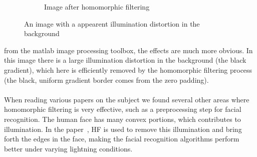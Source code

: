 \begin{figure}[h!]
\begin{subfigure}[b]{0.5\linewidth}
          \caption{Image after homomorphic filtering}
          \label{fig:microbe_after}
        \end{subfigure}
        \caption{An image with a appearent illumination distortion in the background}	
        \label{fig:gamma_diff}
		\end{figure}
		from the matlab image processing toolbox, the effects are much more obvious. 
		In this image there is a large illumination
		distortion in the background (the black gradient), which here is efficiently 
		removed by the homomorphic filtering process (the black, uniform gradient border
		comes from the zero padding). \\
		\\
		When reading various papers on the
		subject we found several other areas where homomorphic filtering is very effective,
		such as a preprocessing step for facial recognition. The human face has many convex
		portions, which contributes to illumination. In the paper~\cite{Fan20111468}, HF
		is used to remove this illumination and bring forth the edges in the face, making
		the facial recognition algorithms perform better under varying lightning conditions.